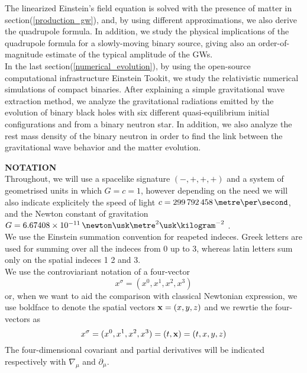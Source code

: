 The linearized Einstein's field equation is solved with the presence of matter in section(\ref{production_gw}), and, by using different approximations, we also derive the quadrupole formula. 
In addition, we study the physical implications of the quadrupole formula for a slowly-moving binary source, giving also an order-of-magnitude estimate of the typical amplitude of the GWs.\\
In the last section(\ref{numerical_evolution}), by using the open-source computational infrastructure Einstein Tookit\cite{loffler_einstein_2012}, we study the relativistic numerical simulations of compact binaries.
After explaining a simple gravitational wave extraction method, we analyze the gravitational radiations emitted by the evolution of binary black holes with six different quasi-equilibrium initial configurations and from a binary neutron star.
In addition, we also analyze the rest mass density of the binary neutron in order to find the link between the gravitational wave behavior and the matter evolution.

\textbf{NOTATION}\\
Throughout, we will use a spacelike signature $(-,+,+,+)$ and a system of geometrised units in which $G=c=1$, however depending on the need we will also indicate explicitely the speed of light $c=299\,792\,458 \,\metre \per \second$, and the Newton constant of gravitation $G=6.67408 \times 10^{-11} \, \newton \usk \metre^2 \usk \kilogram^{-2}$ \cite{codata_blog_codata_nodate}.\\
We use the Einstein summation convention for  reapeted indeces.
Greek letters are used for summing over all the indeces from 0 up to 3,
whereas latin letters sum only on the spatial indeces 1 2 and 3.\\
We use the controviariant notation of a four-vector
\[
x^{\sigma} = (x^{0},x^{1}, x^{2},x^{3})
\]
or, when we want to aid the comparison with classical Newtonian expression, we use boldface to denote the spatial vectors $\vb{x} =(x,y,z)$ and we rewrtie the four-vectors as 
\[
x^{\sigma} = (x^{0},x^{1}, x^{2},x^{3}) = (t,\vb{x}) = (t,x,y,z)
\]
The four-dimensional covariant and partial derivatives will be indicated respectively with $\nabla _{\mu}$ and $\partial _\mu$.